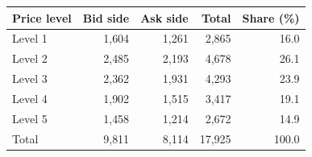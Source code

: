 \begin{tabular}{lrrrr}
\toprule
Price level & Bid side & Ask side & Total & Share (\%) \\
\midrule
Level 1 & 1{,}604 & 1{,}261 & 2{,}865 & 16.0 \\
Level 2 & 2{,}485 & 2{,}193 & 4{,}678 & 26.1 \\
Level 3 & 2{,}362 & 1{,}931 & 4{,}293 & 23.9 \\
Level 4 & 1{,}902 & 1{,}515 & 3{,}417 & 19.1 \\
Level 5 & 1{,}458 & 1{,}214 & 2{,}672 & 14.9 \\
Total & 9{,}811 & 8{,}114 & 17{,}925 & 100.0 \\
\bottomrule
\end{tabular}

